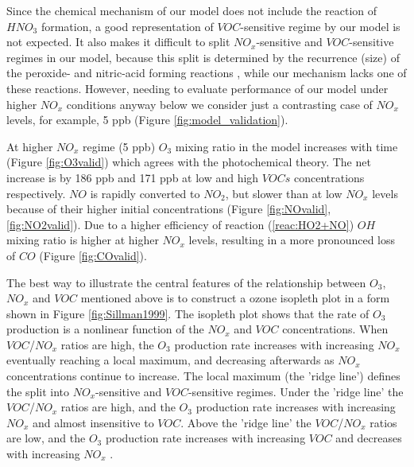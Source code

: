 \documentclass[11pt,a4paper]{article}
\begin{document}
Since the chemical mechanism of our model does not include the reaction of $HNO_3$ formation, a good representation of $VOC$-sensitive regime by our model is not expected. It also makes it difficult to split $NO_x$-sensitive and $VOC$-sensitive regimes in our model, because this split is determined by the recurrence (size) of the peroxide- and nitric-acid forming reactions \citep{Sillman1999}, while our mechanism lacks one of these reactions. However, needing to evaluate performance of our model under higher $NO_x$ conditions anyway below we consider just a contrasting case of $NO_x$ levels, for example, 5 ppb (Figure \ref{fig:model_validation}).

At higher $NO_x$ regime (5 ppb) $O_3$ mixing ratio in the model increases with time (Figure \ref{fig:O3valid}) which agrees with the photochemical theory. The net increase is by 186 ppb and 171 ppb at low and high $VOCs$ concentrations respectively. $NO$ is rapidly converted to $NO_2$, but slower than at low $NO_x$ levels because of their higher initial concentrations (Figure \ref{fig:NOvalid}, \ref{fig:NO2valid}). Due to a higher efficiency of reaction (\ref{reac:HO2+NO}) $OH$ mixing ratio is higher at higher $NO_x$ levels, resulting in a more pronounced loss of $CO$ (Figure \ref{fig:COvalid}).

The best way to illustrate the central features of the relationship between $O_3$, $NO_x$ and $VOC$ mentioned above is to construct a ozone isopleth plot in a form shown in Figure \ref{fig:Sillman1999}. The isopleth plot shows that the rate of $O_3$ production is a nonlinear function of the $NO_x$ and $VOC$ concentrations. When $VOC$/$NO_x$ ratios are high, the $O_3$ production rate increases with increasing $NO_x$ eventually reaching a local maximum, and decreasing afterwards as $NO_x$ concentrations continue to increase. The local maximum (the 'ridge line') defines the split into $NO_x$-sensitive and $VOC$-sensitive regimes. Under the 'ridge line' the $VOC$/$NO_x$ ratios are high, and the $O_3$ production rate increases with increasing $NO_x$ and almost insensitive to $VOC$. Above the 'ridge line' the $VOC$/$NO_x$ ratios are low, and the $O_3$ production rate increases with increasing $VOC$ and decreases with increasing $NO_x$ \citep{Sillman2013}.
\end{document}
